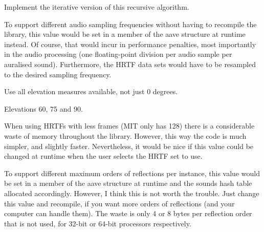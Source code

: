 
\begin{DoxyRefList}
\item[\label{todo__todo000007}%
\hypertarget{todo__todo000007}{}%
Global \hyperlink{geometry_8c_a2c55d6e06ff73570a887d18807442412}{aave\-\_\-create\-\_\-sounds\-\_\-recursively} (struct aave $\ast$aave, struct \hyperlink{structaave__source}{aave\-\_\-source} $\ast$source, unsigned order, unsigned o, struct \hyperlink{structaave__surface}{aave\-\_\-surface} $\ast$surfaces\mbox{[}\mbox{]}, float image\-\_\-sources\mbox{[}\mbox{]}\mbox{[}3\mbox{]})]Implement the iterative version of this recursive algorithm.  
\item[\label{todo__todo000001}%
\hypertarget{todo__todo000001}{}%
Global \hyperlink{aave_8h_aff6fdc3178c7698a824bf53f79d0bdd1}{A\-A\-V\-E\-\_\-\-F\-S} ]To support different audio sampling frequencies without having to recompile the library, this value would be set in a member of the aave structure at runtime instead. Of course, that would incur in performance penalties, most importantly in the audio processing (one floating-\/point division per audio sample per auralised sound). Furthermore, the H\-R\-T\-F data sets would have to be resampled to the desired sampling frequency.  
\item[\label{todo__todo000008}%
\hypertarget{todo__todo000008}{}%
Global \hyperlink{hrtf__cipic_8c_a4b3a15263cf86760cf69027db5aab73a}{aave\-\_\-hrtf\-\_\-cipic\-\_\-get} (const float $\ast$hrtf\mbox{[}2\mbox{]}, int elevation, int azimuth)]Use all elevation measures available, not just 0 degrees.  
\item[\label{todo__todo000009}%
\hypertarget{todo__todo000009}{}%
Global \hyperlink{hrtf__listen_8c_a3239bc0a4a965c5da5334695d4f39c06}{aave\-\_\-hrtf\-\_\-listen\-\_\-get} (const float $\ast$hrtf\mbox{[}2\mbox{]}, int elevation, int azimuth)]Elevations 60, 75 and 90.  
\item[\label{todo__todo000003}%
\hypertarget{todo__todo000003}{}%
Global \hyperlink{aave_8h_a19ea3a18eb313fc3b825f522245d19d3}{A\-A\-V\-E\-\_\-\-M\-A\-X\-\_\-\-H\-R\-T\-F} ]When using H\-R\-T\-Fs with less frames (M\-I\-T only has 128) there is a considerable waste of memory throughout the library. However, this way the code is much simpler, and slightly faster. Nevertheless, it would be nice if this value could be changed at runtime when the user selects the H\-R\-T\-F set to use.  
\item[\label{todo__todo000002}%
\hypertarget{todo__todo000002}{}%
Global \hyperlink{aave_8h_a5cc7807cca10cf0933038ad388171181}{A\-A\-V\-E\-\_\-\-M\-A\-X\-\_\-\-R\-E\-F\-L\-E\-C\-T\-I\-O\-N\-S} ]To support different maximum orders of reflections per instance, this value would be set in a member of the aave structure at runtime and the sounds hash table allocated accordingly. However, I think this is not worth the trouble. Just change this value and recompile, if you want more orders of reflections (and your computer can handle them). The waste is only 4 or 8 bytes per reflection order that is not used, for 32-\/bit or 64-\/bit processors respectively.  

\end{DoxyRefList}
